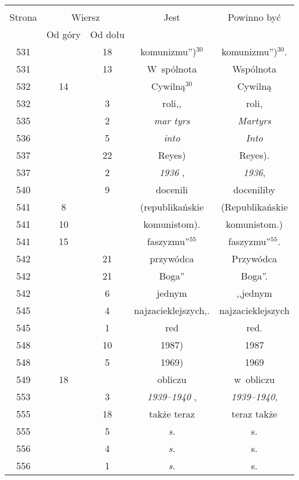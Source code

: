 \documentclass[a4paper,11pt]{article}
\begin{document}
\begin{center}
  \begin{tabular}{|c|c|c|c|c|}
    \hline
    & \multicolumn{2}{c|}{} & & \\
    Strona & \multicolumn{2}{c|}{Wiersz} & Jest
                              & Powinno być \\ \cline{2-3}
    & Od góry & Od dołu & & \\
    \hline
    531 & & 18 &  %
                 komunizmu'')$^{ 30 }$\tb{.}
           & komunizmu'')$^{ 30 }$. \\
    531 & & 13 & W~spólnota & Wspólnota \\
    532 & 14 & & Cywilną$^{ 30 }$ & Cywilną \\
    532 & &  3 & roli,,  %
           & roli, \\
    535 & &  2 & \emph{mar tyrs} & \emph{Martyrs} \\
    536 & &  5 & \emph{into} & \emph{Into} \\
    537 & & 22 & Reyes)\tb{.} & Reyes). \\
    537 & &  2 & \emph{1936} , & \emph{1936}, \\
    540 & &  9 & docenili & doceniliby \\
    541 &  8 & & (republikańskie & (Republikańskie \\
    541 & 10 & & komunistom). & komunistom.) \\
    541 & 15 & & faszyzmu''$^{ 55 }$\tb{.} & faszyzmu''$^{ 55 }$. \\
    542 & & 21 & przywódca & Przywódca \\
    542 & & 21 & Boga'' & Boga''. \\
    542 & &  6 & jednym & ,,jednym  %
    \\
    545 & &  4 & najzacieklejszych,. & najzacieklejszych \\
    545 & &  1 & red & red. \\
    548 & & 10 & 1987) & 1987 \\
    548 & &  5 & 1969) & 1969 \\
    549 & 18 & & obliczu & w~obliczu \\
    553 & &  3 & \emph{1939--1940} , & \emph{1939--1940}, \\
    555 & & 18 & także teraz & teraz także \\
    555 & &  5 & \emph{s.} & s. \\
    556 & &  4 & \emph{s.} & s. \\
    556 & &  1 & \emph{s.} & s. \\

\end{tabular}
\end{center}
\end{document}
